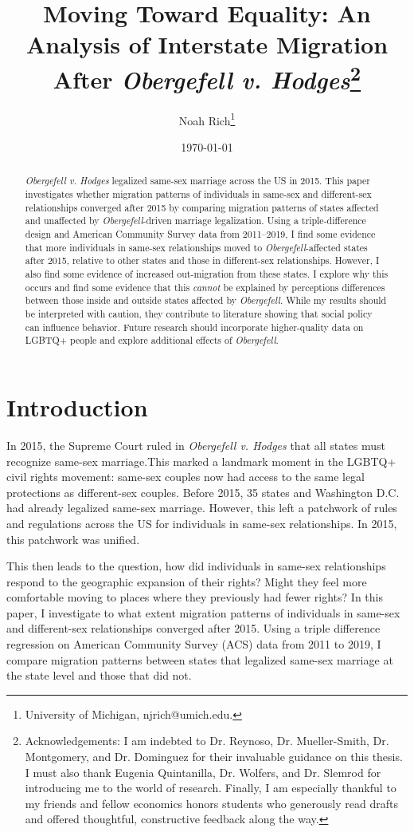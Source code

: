 \documentclass[12pt,letterpaper]{article}
\title{Moving Toward Equality: An Analysis of Interstate Migration After \textit{Obergefell v. Hodges}\footnote{Acknowledgements: I am indebted to Dr. Reynoso, Dr. Mueller-Smith, Dr. Montgomery, and Dr. Dominguez for their invaluable guidance on this thesis. I must also thank Eugenia Quintanilla, Dr. Wolfers, and Dr. Slemrod for introducing me to the world of research. Finally, I am especially thankful to my friends and fellow economics honors students who generously read drafts and offered thoughtful, constructive feedback along the way.}}
\author{Noah Rich\footnote{University of Michigan, njrich@umich.edu.}}
\date{\today}
\begin{document}
\doublespacing

\maketitle


\begin{abstract}
\textit{Obergefell v. Hodges} legalized same-sex marriage across the US in 2015. This paper investigates whether migration patterns of individuals in same-sex and different-sex relationships converged after 2015 by comparing migration patterns of states affected and unaffected by \textit{Obergefell}-driven marriage legalization. Using a triple-difference design and American Community Survey data from 2011–2019, I find some evidence that more individuals in same-sex relationships moved to \textit{Obergefell}-affected states after 2015, relative to other states and those in different-sex relationships. However, I also find some evidence of increased out-migration from these states. I explore why this occurs and find some evidence that this \textit{cannot} be explained by perceptions differences between those inside and outside states affected by \textit{Obergefell}. While my results should be interpreted with caution, they contribute to literature showing that social policy can influence behavior. Future research should incorporate higher-quality data on LGBTQ+ people and explore additional effects of \textit{Obergefell}.
\end{abstract}

\newpage

\section{Introduction}

In 2015, the Supreme Court ruled in \textit{Obergefell v. Hodges} that all states must recognize same-sex marriage.This marked a landmark moment in the LGBTQ+ civil rights movement: same-sex couples now had access to the same legal protections as different-sex couples. Before 2015, 35 states and Washington D.C. had already legalized same-sex marriage. However, this left a patchwork of rules and regulations across the US for individuals in same-sex relationships. In 2015, this patchwork was unified.

This then leads to the question, how did individuals in same-sex relationships respond to the geographic expansion of their rights? Might they feel more comfortable moving to places where they previously had fewer rights? In this paper, I investigate to what extent migration patterns of individuals in same-sex and different-sex relationships converged after 2015. Using a triple difference regression on American Community Survey (ACS) data from 2011 to 2019, I compare migration patterns between states that legalized same-sex marriage at the state level and those that did not.
\end{document}
